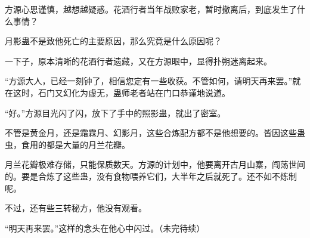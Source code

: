 \begin{this_body}
方源心思谨慎，越想越疑惑。花酒行者当年战败家老，暂时撤离后，到底发生了什么事情？

月影蛊不是致他死亡的主要原因，那么究竟是什么原因呢？

一下子，原本清晰的花酒行者遗藏，又在方源眼中，显得扑朔迷离起来。

“方源大人，已经一刻钟了，相信您定有一些收获。不管如何，请明天再来罢。”就在这时，石门又幻化为虚无，蛊师老者站在门口恭谨地说道。

“好。”方源目光闪了闪，放下了手中的照影蛊，就出了密室。

不管是黄金月，还是霜霖月、幻影月，这些合炼配方都不是他想要的。皆因这些蛊虫，食用的都是大量的月兰花瓣。

月兰花瓣极难存储，只能保质数天。方源的计划中，他要离开古月山寨，闯荡世间的。要是合炼了这些蛊，没有食物喂养它们，大半年之后就死了。还不如不炼制呢。

不过，还有些三转秘方，他没有观看。

“明天再来罢。”这样的念头在他心中闪过。（未完待续）

\end{this_body}

